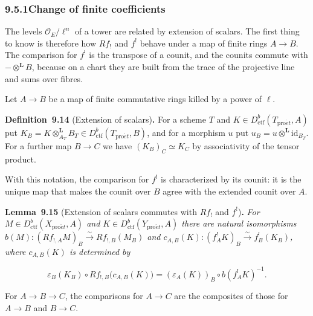 \documentclass[11pt]{article}
\newenvironment{bpstatement}[2]{\par\addvspace{0.6\baselineskip}\noindent\textbf{#1}#2\textbf{.}\enspace\ignorespaces}
  {\par\addvspace{0.4\baselineskip}}
\newenvironment{bpstatementit}[2]{\begin{bpstatement}{#1}{#2}\itshape\ignorespaces}{\end{bpstatement}}
\begin{document}
\subsubsection*{\texorpdfstring{9.5.1\quad Change of finite coefficients}{9.5.1 Change of finite coefficients}}
\label{bp45}%
\label{bp46}%
The levels \(\mathcal O_E/\ell^n\) of a tower are related by extension of scalars. The first thing to know is therefore how \(Rf_!\) and \(f^!\) behave under a map of finite rings \(A\to B\). The comparison for \(f^!\) is the transpose of a counit, and the counits commute with \(-\otimes^{\mathbf L}B\), because on a chart they are built from the trace of the projective line and sums over fibres.

Let \(A\to B\) be a map of finite commutative rings killed by a power of \(\ell\).

\label{bp47}%
\begin{bpstatement}{Definition~9.14}{ (Extension of scalars)}
For a scheme \(T\) and \(K\in D^b_{\mathrm{ctf}}(T_{\mathrm{pro}\acute{e}t},A)\) put \(K_B=K\otimes^{\mathbf L}_{A_T}B_T\in D^b_{\mathrm{ctf}}(T_{\mathrm{pro}\acute{e}t},B)\), and for a morphism \(u\) put \(u_B=u\otimes^{\mathbf L}\mathrm{id}_{B_T}\). For a further map \(B\to C\) we have \((K_B)_C\simeq K_C\) by associativity of the tensor product.
\end{bpstatement}

\label{bp48}%
With this notation, the comparison for \(f^!\) is characterized by its counit: it is the unique map that makes the counit over \(B\) agree with the extended counit over \(A\).

\label{bp49}%
\begin{bpstatementit}{Lemma~9.15}{ (Extension of scalars commutes with $Rf_!$ and $f^!$)}
For \(M\in D^b_{\mathrm{ctf}}(X_{\mathrm{pro}\acute{e}t},A)\) and \(K\in D^b_{\mathrm{ctf}}(Y_{\mathrm{pro}\acute{e}t},A)\) there are natural isomorphisms \(b(M):(Rf_{!,A}M)_B\xrightarrow{\sim}Rf_{!,B}(M_B)\) and \(c_{A,B}(K):(f_A^!K)_B\xrightarrow{\sim}f_B^!(K_B)\), where \(c_{A,B}(K)\) is determined by

\[
\varepsilon_B(K_B)\circ Rf_{!,B}\bigl(c_{A,B}(K)\bigr)
=(\varepsilon_A(K))_B\circ b(f_A^!K)^{-1}.
\tag{9.16}
\]

For \(A\to B\to C\), the comparisons for \(A\to C\) are the composites of those for \(A\to B\) and \(B\to C\).
\end{bpstatementit}
\end{document}
